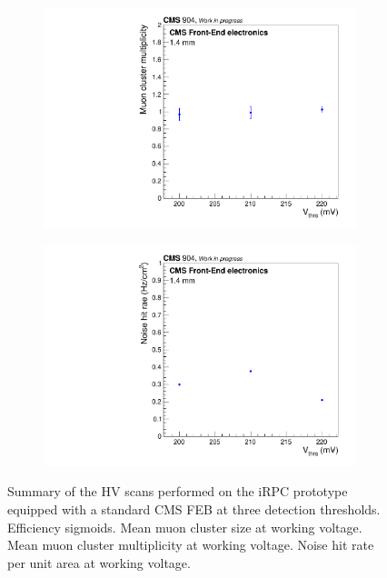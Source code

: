 \begin{figure}[H]
\begin{subfigure}{.5\linewidth}
			\caption{\label{fig:iRPC_CMS_Result:B}}
		\end{subfigure}
		\begin{subfigure}{.5\linewidth}
		    \centering
			\includegraphics[width = \linewidth]{fig/chapt6/iRPC-CMS_FEB-thrs_CMP.pdf}
			\caption{\label{fig:iRPC_CMS_Result:C}}
		\end{subfigure}
		\begin{subfigure}{.5\linewidth}
		    \centering
			\includegraphics[width = \linewidth]{fig/chapt6/iRPC-CMS_FEB-thrs_noiseRate.pdf}
			\caption{\label{fig:iRPC_CMS_Result:D}}
		\end{subfigure}
		\caption{\label{fig:iRPC_CMS_Result} Summary of the HV scans performed on the iRPC prototype equipped with a standard CMS FEB at three detection thresholds.  Efficiency sigmoids.  Mean muon cluster size at working voltage.  Mean muon cluster multiplicity at working voltage.  Noise hit rate per unit area at working voltage.}
    \end{figure}
	
